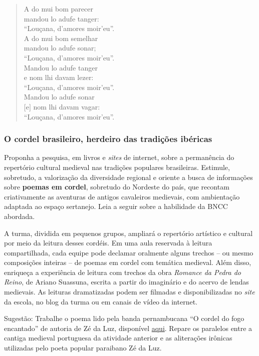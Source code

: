 \documentclass[11pt]{extarticle}
\begin{document}
\begin{verse}
A do mui bom parecer\\
mandou lo adufe tanger:\\
\quad ``Louçana, d'amores moir'eu''.\\
A do mui bom semelhar\\
mandou lo adufe sonar;\\
\quad ``Louçana, d'amores moir'eu''.\\
Mandou lo adufe tanger\\
e nom lhi davam lezer:\\
\quad ``Louçana, d'amores moir'eu''.\\
Mandou lo adufe sonar\\
$[$e$]$ nom lhi davam vagar:\\
\quad ``Louçana, d'amores moir'eu''.
\end{verse}


\subsubsection{O cordel brasileiro, herdeiro das tradições ibéricas}

  Proponha a pesquisa, em livros e \emph{sites} de internet, sobre a
  permanência do repertório cultural medieval nas tradições populares
  brasileiras. Estimule, sobretudo, a valorização da diversidade
  regional e oriente a busca de informações sobre \textbf{poemas em
  cordel}, sobretudo do Nordeste do país, que recontam criativamente as
  aventuras de antigos cavaleiros medievais, com ambientação adaptada ao
  espaço sertanejo. Leia a seguir sobre a habilidade da BNCC abordada. 

  A turma, dividida em pequenos grupos, ampliará o
  repertório artístico e cultural por meio da leitura desses cordéis. Em
  uma aula reservada à leitura compartilhada, cada equipe pode declamar
  oralmente alguns trechos -- ou mesmo composições inteiras -- de poemas
  em cordel com temática medieval. Além disso, enriqueça a experiência
  de leitura com trechos da obra \emph{Romance da Pedra do Reino}, de
  Ariano Suassuna, escrita a partir do imaginário e do acervo de lendas
  medievais. As leituras dramatizadas podem ser filmadas e
  disponibilizadas no \emph{site} da escola, no blog da turma ou em
  canais de vídeo da internet.


  Sugestão: Trabalhe o poema lido pela banda pernambucana ``O cordel do fogo encantado'' 
  de autoria de Zé da Luz, disponível \href{https://youtu.be/8NBauvFV6bo}{aqui}.
  Repare os paralelos entre a cantiga medieval portuguesa da atividade 
  anterior e as aliterações irônicas utilizadas pelo poeta popular paraibano Zé da Luz.
\end{document}
